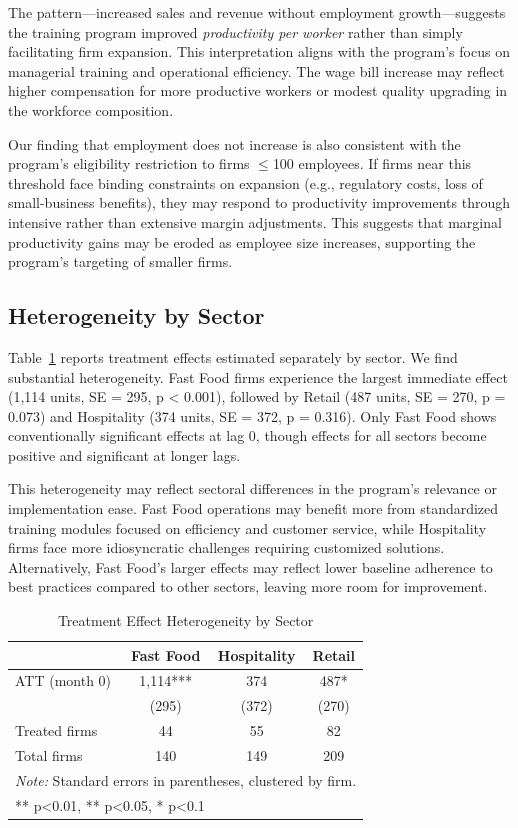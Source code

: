 \documentclass{article}
\begin{document}
The pattern—increased sales and revenue without employment growth—suggests the training program improved \textit{productivity per worker} rather than simply facilitating firm expansion. This interpretation aligns with the program's focus on managerial training and operational efficiency. The wage bill increase may reflect higher compensation for more productive workers or modest quality upgrading in the workforce composition.

Our finding that employment does not increase is also consistent with the program's eligibility restriction to firms $\leq$100 employees. If firms near this threshold face binding constraints on expansion (e.g., regulatory costs, loss of small-business benefits), they may respond to productivity improvements through intensive rather than extensive margin adjustments. This suggests that marginal productivity gains may be eroded as employee size increases, supporting the program's targeting of smaller firms.

\subsection{Heterogeneity by Sector}

Table~\ref{tab:sector_het} reports treatment effects estimated separately by sector. We find substantial heterogeneity. Fast Food firms experience the largest immediate effect (1,114 units, SE = 295, p < 0.001), followed by Retail (487 units, SE = 270, p = 0.073) and Hospitality (374 units, SE = 372, p = 0.316). Only Fast Food shows conventionally significant effects at lag 0, though effects for all sectors become positive and significant at longer lags.

This heterogeneity may reflect sectoral differences in the program's relevance or implementation ease. Fast Food operations may benefit more from standardized training modules focused on efficiency and customer service, while Hospitality firms face more idiosyncratic challenges requiring customized solutions. Alternatively, Fast Food's larger effects may reflect lower baseline adherence to best practices compared to other sectors, leaving more room for improvement.

\begin{table}[htbp]
\centering
\caption{Treatment Effect Heterogeneity by Sector}
\label{tab:sector_het}
\begin{tabular}{lccc}
\toprule
& Fast Food & Hospitality & Retail \\
\midrule
ATT (month 0) & 1,114*** & 374 & 487* \\
& (295) & (372) & (270) \\
Treated firms & 44 & 55 & 82 \\
Total firms & 140 & 149 & 209 \\
\bottomrule
\multicolumn{4}{l}{\small \textit{Note:} Standard errors in parentheses, clustered by firm.} \\
\multicolumn{4}{l}{\small *** p<0.01, ** p<0.05, * p<0.1} \\
\end{tabular}
\end{table}
\end{document}
